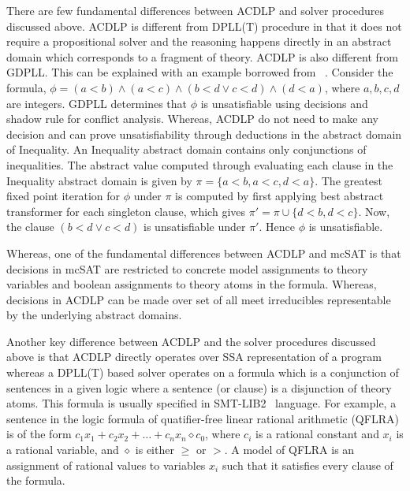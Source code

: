 %
There are few fundamental differences between ACDLP and solver procedures discussed above. 
ACDLP is different from DPLL(T) procedure in that it does not require a propositional solver and 
the reasoning happens directly in an abstract domain which corresponds to a fragment of theory.  
ACDLP is also different from GDPLL.  This can be explained with an example borrowed from
~\cite{DBLP:conf/cav/McMillanKS09}.  Consider the formula, 
$\phi = (a < b) \wedge (a < c) \wedge (b < d \vee c < d) \wedge (d < a)$, where $a,b,c,d$ are integers.  
GDPLL determines that $\phi$ is unsatisfiable using decisions and shadow rule for conflict analysis.  
Whereas, ACDLP do not need to make any decision and can prove unsatisfiability through deductions 
in the abstract domain of Inequality.  An Inequality abstract domain contains only conjunctions of 
inequalities. The abstract value computed through evaluating each clause in the Inequality abstract 
domain is given by $\pi = \{a < b, a < c, d < a\}$.  The greatest fixed point iteration for $\phi$ under
$\pi$ is computed by first applying best abstract transformer for each singleton clause, which gives 
$\pi'= \pi \cup \{ d < b, d < c \}$.  Now, the clause $(b < d \vee c < d)$ is unsatisfiable under 
$\pi'$.  Hence $\phi$ is unsatisfiable. 


Whereas, one of the fundamental differences between ACDLP and mcSAT is that decisions in mcSAT 
are restricted to concrete model assignments to theory variables and boolean assignments to 
theory atoms in the formula.  Whereas, decisions in ACDLP can be made over set of all meet 
irreducibles representable by the underlying abstract domains.



Another key difference between ACDLP and the solver procedures discussed above is that 
ACDLP directly operates over SSA representation of a program whereas a DPLL(T) based solver 
operates on a formula which is a conjunction of sentences in a given logic where a sentence 
(or clause) is a disjunction of theory atoms. This formula is usually specified in 
SMT-LIB2~\cite{smt-lib2} language.  For example, a sentence in the logic formula of 
quatifier-free linear rational arithmetic (QFLRA) is of the form 
$c_1x_1 + c_2x_2 + \ldots + c_nx_n \diamond c_0$, where $c_i$ is a rational constant 
and $x_i$ is a rational variable, and $\diamond$ is either $\geq$ or $>$.  A model of 
QFLRA is an assignment of rational values to variables $x_i$ such that it satisfies 
every clause of the formula.   
